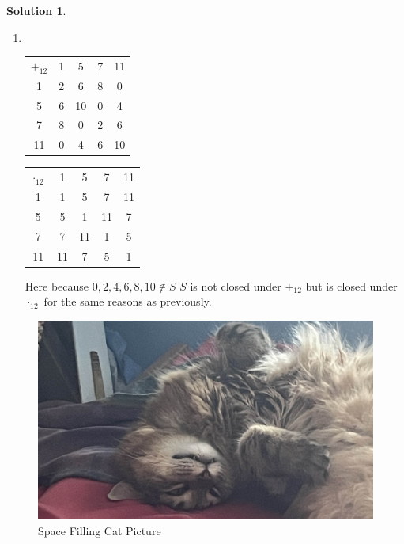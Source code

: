 \documentclass[10pt]{article}
\theoremstyle{definition}
\newtheorem{soln}{Solution}
\begin{document}
\begin{soln}
\begin{enumerate}[label=(\alph*)]
    \item ~\begin{center}
            \setlength\extrarowheight{3pt}
            \noindent\begin{tabular}{c | c c c c}
              $+_{12}$ & 1 & 5  & 7 & 11 \\
              \cline{1-5}
              1        & 2 & 6  & 8 & 0  \\
              5        & 6 & 10 & 0 & 4  \\
              7        & 8 & 0  & 2 & 6  \\
              11       & 0 & 4  & 6 & 10 \\
            \end{tabular}
            \qquad
            \noindent\begin{tabular}{c | c c c c}
              $\cdot_{12}$ & 1  & 5  & 7  & 11 \\
              \cline{1-5}
              1            & 1  & 5  & 7  & 11 \\
              5            & 5  & 1  & 11 & 7  \\
              7            & 7  & 11 & 1  & 5  \\
              11           & 11 & 7  & 5  & 1  \\
            \end{tabular}
          \end{center}
          Here because $0,2,4,6,8,10\notin S$ $S$ is not closed under $+_{12}$ but is closed under $\cdot_{12}$ for the same reasons as previously.
  \end{enumerate}
\end{soln}
\begin{figure}[ht]
  \centering
  \includegraphics[scale=0.5]{space filling cat.jpg}
  \caption{Space Filling Cat Picture}
\end{figure}
\newpage
\end{document}
